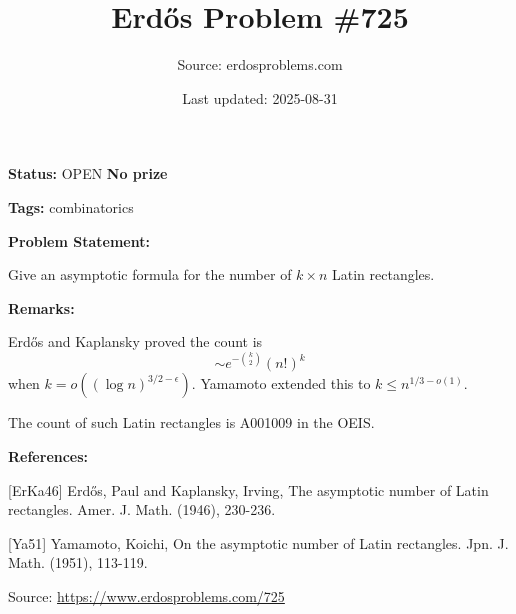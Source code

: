 \documentclass{article}
\title{Erd\H{o}s Problem \#725}
\date{Last updated: 2025-08-31}
\author{Source: erdosproblems.com}
\begin{document}
\maketitle

\noindent\textbf{Status:} OPEN \quad \textbf{No prize}

\noindent\textbf{Tags:} combinatorics

\medskip
\noindent\textbf{Problem Statement:}

Give an asymptotic formula for the number of $k\times n$ Latin rectangles.

\bigskip
\noindent\textbf{Remarks:}

Erd\H{o}s and Kaplansky \cite{ErKa46} proved the count is\[\sim e^{-\binom{k}{2}}(n!)^k\]when $k=o((\log n)^{3/2-\epsilon})$. Yamamoto \cite{Ya51} extended this to $k\leq n^{1/3-o(1)}$.

The count of such Latin rectangles is A001009 in the OEIS.

\bigskip
\noindent\textbf{References:}

[ErKa46] Erd\H{o}s, Paul and Kaplansky, Irving, The asymptotic number of Latin rectangles. Amer. J. Math. (1946), 230-236.
 
 [Ya51] Yamamoto, Koichi, On the asymptotic number of Latin rectangles. Jpn. J. Math. (1951), 113-119.

\bigskip
\noindent\small{Source: \url{https://www.erdosproblems.com/725}}
\end{document}
